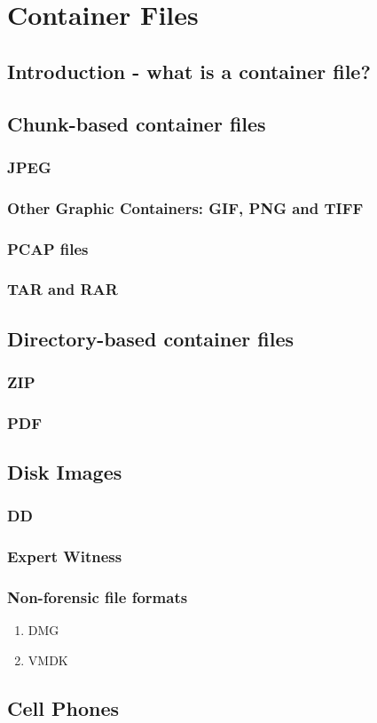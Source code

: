 \chapter{Container Files}
\section{Introduction - what is a container file?}
\section{Chunk-based container files}
\subsection{JPEG}
\subsection{Other Graphic Containers: GIF, PNG and TIFF}
\subsection{PCAP files}
\subsection{TAR and RAR}
\section{Directory-based container files}
\subsection{ZIP}
\subsection{PDF}
\section{Disk Images}
\subsection{DD}
\subsection{Expert Witness}
\subsection{Non-forensic file formats}
\begin{enumerate}
\item DMG
\item VMDK
\end{enumerate}
\section{Cell Phones}

